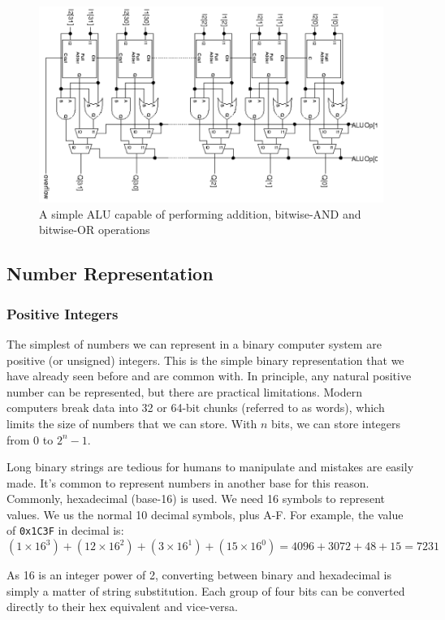 \documentclass{article}
\begin{document}
	\begin{figure}[ht]
		\centering
		\includegraphics[width=1\textwidth]{simple_ALU}
		\caption{A simple ALU capable of performing addition, bitwise-AND and bitwise-OR operations}
		\label{fig:simple ALU}
	\end{figure}	
	
	\subsection{Number Representation}
	\subsubsection{Positive Integers}
	The simplest of numbers we can represent in a binary computer system are positive (or unsigned) integers. This is the simple binary representation that we have already seen before and are common with. In principle, any natural positive number can be represented, but there are practical limitations. Modern computers break data into 32 or 64-bit chunks (referred to as words), which limits the size of numbers that we can store. With $n$ bits, we can store integers from 0 to $2^{n} - 1$.
	
	\par 
	Long binary strings are tedious for humans to manipulate and mistakes are easily made. It's common to represent numbers in another base for this reason. Commonly, hexadecimal (base-16) is used. We need 16 symbols to represent values. We us the normal 10 decimal symbols, plus A-F. For example, the value of \texttt{0x1C3F} in decimal is:
	\[ (1 \times 16^{3}) + (12 \times 16^{2}) + (3 \times 16^{1}) + (15 \times 16^{0}) = 4096 + 3072 + 48 + 15 = 7231 \]
	
	As 16 is an integer power of 2, converting between binary and hexadecimal is simply a matter of string substitution. Each group of four bits can be converted directly to their hex equivalent and vice-versa.
	
\end{document}
